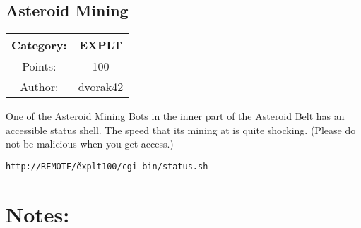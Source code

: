 \begin{center}
\section*{Asteroid Mining}
{\large
\begin{tabular}{| c c |}
\hline
Category: & EXPLT\\\hline
Points: & 100\\\hline
Author: & dvorak42\\\hline
\end{tabular}
}
\end{center}
\vspace{0.5in}

{\large
One of the Asteroid Mining Bots in the inner part of the Asteroid Belt has an accessible status shell. The speed that its mining at is quite shocking. (Please do not be malicious when you get access.)
}
\vspace{0.25in}
\begin{center}
  {\Large\tt http://REMOTE/\~explt100/cgi-bin/status.sh}
\end{center}

\vspace{0.25in}
\section*{Notes:}
